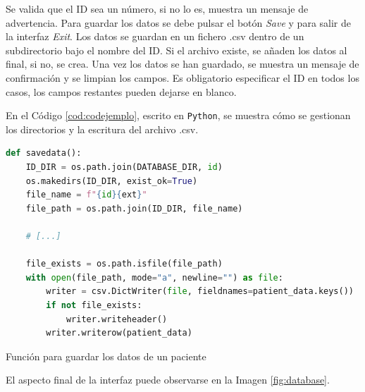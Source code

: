 Se valida que el ID sea un número, si no lo es, muestra un mensaje de advertencia.
Para guardar los datos se debe pulsar el botón \textit{Save} y para salir de la interfaz \textit{Exit}.
Los datos se guardan en un fichero .csv dentro de un subdirectorio bajo el nombre del ID. Si el archivo existe, se añaden los datos al final, si no, se crea.
Una vez los datos se han guardado, se muestra un mensaje de confirmación y se limpian los campos.
Es obligatorio especificar el ID en todos los casos, los campos restantes pueden dejarse en blanco.

En el Código \ref{cod:codejemplo}, escrito en \texttt{Python}, se muestra cómo se gestionan los directorios y la escritura del archivo .csv.

\begin{code}[h]
\begin{lstlisting}[language=Python]
def savedata():
    ID_DIR = os.path.join(DATABASE_DIR, id)
    os.makedirs(ID_DIR, exist_ok=True)
    file_name = f"{id}{ext}"
    file_path = os.path.join(ID_DIR, file_name)

    # [...]

    file_exists = os.path.isfile(file_path)
    with open(file_path, mode="a", newline="") as file:
        writer = csv.DictWriter(file, fieldnames=patient_data.keys())
        if not file_exists:
            writer.writeheader()
        writer.writerow(patient_data)
\end{lstlisting}
\caption[Función para guardar los datos de un paciente]{Función para guardar los datos de un paciente}
\label{cod:codejemplo}
\end{code}

El aspecto final de la interfaz puede observarse en la Imagen \ref{fig:database}.

